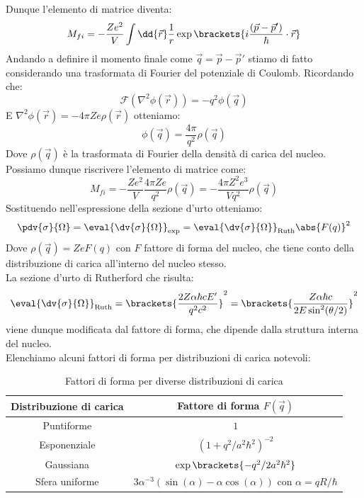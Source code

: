 Dunque l'elemento di matrice diventa:
\begin{equation}
  M_{fi} = -\dfrac{Z e^2}{V} \int \dd{\vec{r}} \dfrac{1}{r}\exp\brackets{i \dfrac{(\vec{p}-\vec{p}')}{\hbar} \cdot \vec{r}}
\end{equation}
Andando a definire il momento finale come $\vec{q} = \vec{p} - \vec{p}'$ stiamo di fatto considerando una trasformata di Fourier del potenziale di Coulomb. Ricordando che:
\begin{equation}
  \mathcal{F}(\nabla^2 \phi(\vec{r})) = -q^2 \phi(\vec{q})
\end{equation}
E $\nabla^2 \phi(\vec{r}) = -4 \pi Z e \rho(\vec{r})$ otteniamo:
\begin{equation}
  \phi(\vec{q}) = \dfrac{4 \pi }{q^2} \rho(\vec{q})
\end{equation}
Dove $\rho(\vec{q})$ è la trasformata di Fourier della densità di carica del nucleo.\\
Possiamo dunque riscrivere l'elemento di matrice come:
\begin{equation}
  M_{fi} = -\dfrac{Z e^2}{V} \dfrac{4 \pi Z e}{q^2} \rho(\vec{q}) = -\dfrac{4 \pi Z^2 e^3}{V q^2} \rho(\vec{q})
\end{equation}
Sostituendo nell'espressione della sezione d'urto otteniamo:
\begin{equation}
  \pdv{\sigma}{\Omega} = \eval{\dv{\sigma}{\Omega}}_{\text{exp}} = \eval{\dv{\sigma}{\Omega}}_{\text{Ruth}} \abs{F(q)}^2
\end{equation}
Dove $\rho(\vec{q}) = Ze F(q)$ con $F$ fattore di forma del nucleo, che tiene conto della distribuzione di carica all'interno del nucleo stesso.\\
La sezione d'urto di Rutherford che risulta:
\begin{equation}
  \eval{\dv{\sigma}{\Omega}}_{\text{Ruth}} = \brackets{\dfrac{2Z \alpha\hbar c E'}{q^2 c^2}}^2 = \brackets{\dfrac{Z \alpha\hbar c}{2 E \sin^2(\theta/2)}}^2
\end{equation}
viene dunque modificata dal fattore di forma, che dipende dalla struttura interna del nucleo.\\
Elenchiamo alcuni fattori di forma per distribuzioni di carica notevoli:
\begin{table}[H]
  \centering
  \begin{tabular}{cc}
    \hline
    \textbf{Distribuzione di carica} & \textbf{Fattore di forma} $F(\vec{q})$ \\
    \hline
    Puntiforme & $1$ \\[8pt]
    Esponenziale & $(1 + q^2/a^2\hbar^2)^{-2}$ \\[8pt]
    Gaussiana & $\exp\brackets{-q^2/2a^2 \hbar^2}$ \\[8pt]
    Sfera uniforme & $3\alpha^{-3}(\sin(\alpha) - \alpha \cos(\alpha))$ con $\alpha = qR/\hbar$ \\
    \hline
  \end{tabular}
  \caption{Fattori di forma per diverse distribuzioni di carica}
\end{table}
